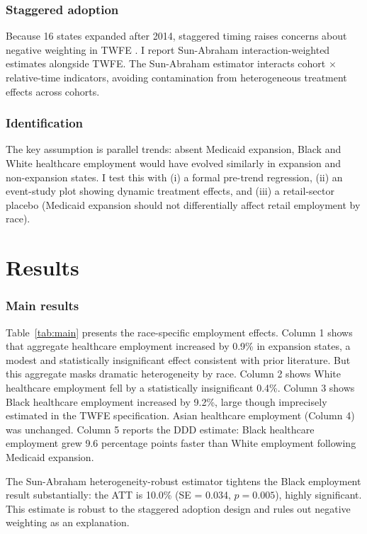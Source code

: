 \documentclass[12pt]{article}
\begin{document}
\subsubsection*{Staggered adoption} Because 16 states expanded after 2014, staggered timing raises concerns about negative weighting in TWFE \citep{goodmanbacon2021, dechaisemartin2020}. I report Sun-Abraham \citep{sunab2021} interaction-weighted estimates alongside TWFE. The Sun-Abraham estimator interacts cohort $\times$ relative-time indicators, avoiding contamination from heterogeneous treatment effects across cohorts.

\subsubsection*{Identification} The key assumption is parallel trends: absent Medicaid expansion, Black and White healthcare employment would have evolved similarly in expansion and non-expansion states. I test this with (i) a formal pre-trend regression, (ii) an event-study plot showing dynamic treatment effects, and (iii) a retail-sector placebo (Medicaid expansion should not differentially affect retail employment by race).

\section{Results}
\label{sec:results}



\subsubsection*{Main results} Table~\ref{tab:main} presents the race-specific employment effects. Column 1 shows that aggregate healthcare employment increased by 0.9\% in expansion states, a modest and statistically insignificant effect consistent with prior literature. But this aggregate masks dramatic heterogeneity by race. Column 2 shows White healthcare employment fell by a statistically insignificant 0.4\%. Column 3 shows Black healthcare employment increased by 9.2\%, large though imprecisely estimated in the TWFE specification. Asian healthcare employment (Column 4) was unchanged. Column 5 reports the DDD estimate: Black healthcare employment grew 9.6 percentage points faster than White employment following Medicaid expansion.

The Sun-Abraham heterogeneity-robust estimator tightens the Black employment result substantially: the ATT is 10.0\% (SE = 0.034, $p = 0.005$), highly significant. This estimate is robust to the staggered adoption design and rules out negative weighting as an explanation.
\end{document}
